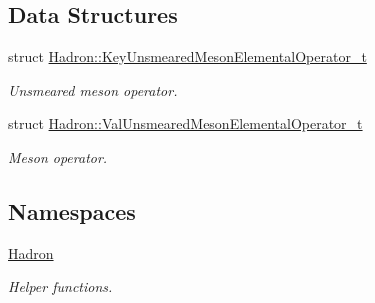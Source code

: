 \subsection*{Data Structures}
\begin{DoxyCompactItemize}
\item 
struct \mbox{\hyperlink{structHadron_1_1KeyUnsmearedMesonElementalOperator__t}{Hadron\+::\+Key\+Unsmeared\+Meson\+Elemental\+Operator\+\_\+t}}
\begin{DoxyCompactList}\small\item\em Unsmeared meson operator. \end{DoxyCompactList}\item 
struct \mbox{\hyperlink{structHadron_1_1ValUnsmearedMesonElementalOperator__t}{Hadron\+::\+Val\+Unsmeared\+Meson\+Elemental\+Operator\+\_\+t}}
\begin{DoxyCompactList}\small\item\em Meson operator. \end{DoxyCompactList}\end{DoxyCompactItemize}
\subsection*{Namespaces}
\begin{DoxyCompactItemize}
\item 
 \mbox{\hyperlink{namespaceHadron}{Hadron}}
\begin{DoxyCompactList}\small\item\em Helper functions. \end{DoxyCompactList}\end{DoxyCompactItemize}
